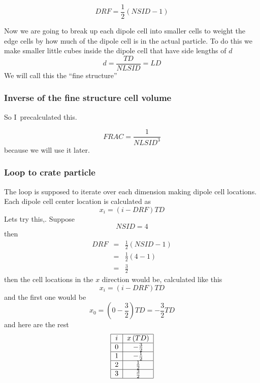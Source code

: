 \documentclass{article}
\begin{document}
\[
DRF=\frac{1}{2}\left( NSID-1\right) 
\]

Now we are going to break up each dipole cell into smaller cells to weight
the edge cells by how much of the dipole cell is in the actual particle. To
do this we make smaller little cubes inside the dipole cell that have side
lengths of $d$%
\[
d=\frac{TD}{NLSID}=LD 
\]%
We will call this the \textquotedblleft fine structure\textquotedblright 
{}

\subsubsection{Inverse of the fine structure cell volume}

So I\ precalculated this.

\[
FRAC=\frac{1}{NLSID^{3}} 
\]%
because we will use it later.

\subsubsection{Loop to crate particle}


The loop is supposed to iterate over each dimension making dipole cell
locations. Each dipole cell center location is calculated as 
\[
x_{i}=\left( i-DRF\right) TD 
\]%
Lets try this,. Suppose 
\[
NSID=4 
\]%
then 
\begin{eqnarray*}
DRF &=&\frac{1}{2}\left( NSID-1\right) \\
&=&\frac{1}{2}\left( 4-1\right) \\
&=&\allowbreak \frac{3}{2}
\end{eqnarray*}%
then the cell locations in the $x$ direction would be, calculated like this%
\[
x_{i}=\left( i-DRF\right) TD 
\]%
and the first one would be 
\[
x_{0}=\left( 0-\frac{3}{2}\right) TD=-\frac{3}{2}TD 
\]%
and here are the rest%
\[
\begin{tabular}{|c|c|}
\hline
$i$ & $x\left( TD\right) $ \\ \hline
$0$ & $-\frac{3}{2}$ \\ \hline
$1$ & $-\frac{1}{2}$ \\ \hline
$2$ & $\frac{1}{2}$ \\ \hline
$3$ & $\frac{3}{2}$ \\ \hline
\end{tabular}%
\]
\end{document}
